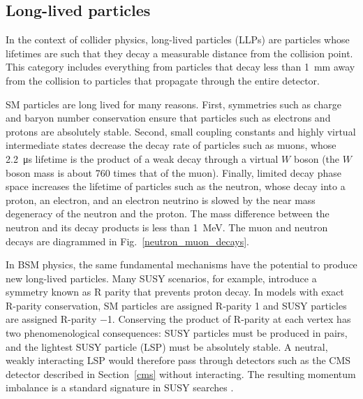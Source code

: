 
\subsection{Long-lived particles}
In the context of collider physics, long-lived particles (LLPs) are particles whose lifetimes are such that they decay a measurable distance from the collision point. This category includes everything from particles that decay less than \SI{1}{\mm} away from the collision to particles that propagate through the entire detector. 

SM particles are long lived for many reasons. First, symmetries such as charge and baryon number conservation ensure that particles such as electrons and protons are absolutely stable. Second, small coupling constants and highly virtual intermediate states decrease the decay rate of particles such as muons, whose \SI{2.2}{\us} lifetime is the product of a weak decay through a virtual $W$ boson (the $W$ boson mass is about \num{760} times that of the muon). Finally, limited decay phase space increases the lifetime of particles such as the neutron, whose decay into a proton, an electron, and an electron neutrino is slowed by the near mass degeneracy of the neutron and the proton. The mass difference between the neutron and its decay products is less than \SI{1}{\MeV}. The muon and neutron decays are diagrammed in Fig.~\ref{neutron_muon_decays}.



In BSM physics, the same fundamental mechanisms have the potential to produce new long-lived particles. Many SUSY scenarios, for example, introduce a symmetry known as R parity that prevents proton decay. In models with exact R-parity conservation, SM particles are assigned R-parity \num{+1} and SUSY particles are assigned R-parity \num{-1}. Conserving the product of R-parity at each vertex has two phenomenological consequences: SUSY particles must be produced in pairs, and the lightest SUSY particle (LSP) must be absolutely stable. A neutral, weakly interacting LSP would therefore pass through detectors such as the CMS detector described in Section~\ref{cms} without interacting. The resulting momentum imbalance is a standard signature in SUSY searches .

